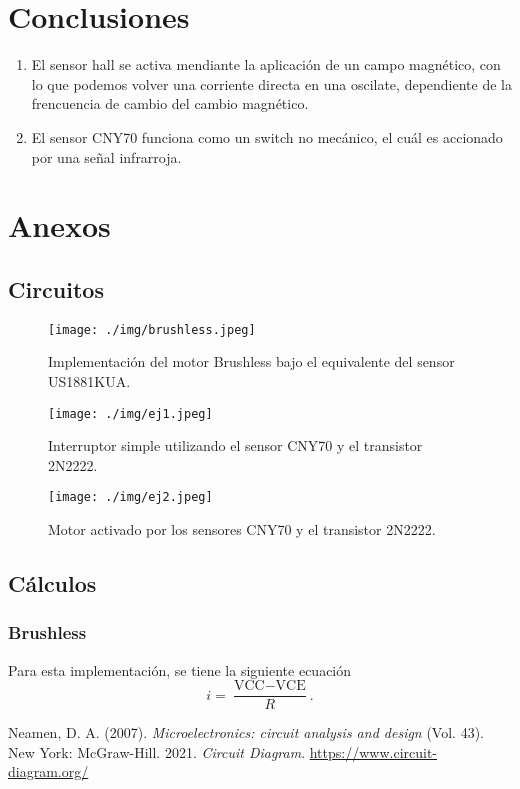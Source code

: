 \documentclass[conference]{IEEEtran}
\begin{document}
\section{Conclusiones}
\begin{enumerate}
    \item El sensor hall se activa mendiante la aplicación de un campo magnético, con lo que podemos volver una corriente directa en una oscilate, dependiente de la frencuencia de cambio del cambio magnético.
    \item El sensor CNY70 funciona como un switch no mecánico, el cuál es accionado por una señal infrarroja.
\end{enumerate}

\section{Anexos}
\subsection{Circuitos}
\begin{figure}[H]
	\centering
	\texttt{[image: ./img/brushless.jpeg]}
	\caption{Implementación del motor Brushless bajo el equivalente del sensor US1881KUA.}
	\label{brushcirc}
\end{figure}



\begin{figure}[H]
	\centering
	\texttt{[image: ./img/ej1.jpeg]}
	\caption{Interruptor simple utilizando el sensor CNY70 y el transistor 2N2222.}
	\label{ej1}
\end{figure}



\begin{figure}[H]
	\centering
	\texttt{[image: ./img/ej2.jpeg]}
	\caption{Motor activado por los sensores CNY70 y el transistor 2N2222.}
	\label{ej2}
\end{figure}

\subsection{Cálculos}
\subsubsection{Brushless}
Para esta implementación, se tiene la siguiente ecuación
	$$ i = \frac{\text{VCC} - \text{VCE}}{R}. $$



\begin{thebibliography}{00}
 Neamen, D. A. (2007). \textit{Microelectronics: circuit analysis and design} (Vol. 43). New York: McGraw-Hill.
 2021. \textit{Circuit Diagram}. \url{https://www.circuit-diagram.org/}
\end{thebibliography}
\end{document}
